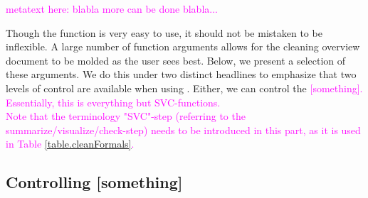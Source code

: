 \documentclass[article]{jss}
\newcommand{\hl}[1]{\textcolor{magenta}{#1}}
\newcommand{\R}[1]{\code{#1}}
\begin{document}
\hl{metatext here: blabla more can be done blabla...} 

Though the \R{clean()} function is very easy to use, it should not be mistaken to be inflexible. A large number of function arguments allows for the cleaning overview document to be molded as the user sees best. Below, we present a selection of these arguments. We do this under two distinct headlines to emphasize that two levels of control are available when using \R{clean()}. Either, we can control the \hl{[something]. Essentially, this is everything but SVC-functions.} \\

\hl{Note that the terminology "SVC"-step (referring to the summarize/visualize/check-step) needs to be introduced in this part, as it is used in Table \ref{table.cleanFormals}.}








\subsection{Controlling [something]}
\label{subsection:controlSomething}
\end{document}
